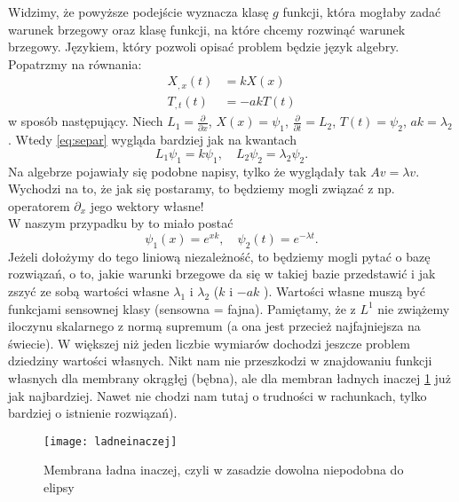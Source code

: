 \documentclass[../main.tex]{subfiles}
\begin{document}
				 Widzimy, że powyższe podejście wyznacza klasę $g$ funkcji, która mogłaby zadać warunek brzegowy oraz klasę funkcji, na które chcemy rozwinąć warunek brzegowy. Językiem, który pozwoli opisać problem będzie język algebry. Popatrzmy na równania:
				 \begin{align}
						 \label{eq:separ}
						 X_{,x}(t) &= k X(x)\\
						 T_{,t}(t) &= -ak T(t)
				 \end{align}
				 w sposób następujący. Niech $L_1 = \frac{\partial }{\partial x}$, $X(x) = \psi_1$, $\frac{\partial }{\partial t} = L_2$, $T(t) = \psi_2$, $ak = \lambda_2$. Wtedy \ref{eq:separ} wygląda bardziej jak na kwantach
				 \[
				 L_1\psi_1 = k\psi_1,\quad L_2\psi_2 = \lambda_2\psi_2
				 .\]
				 Na algebrze pojawiały się podobne napisy, tylko że wyglądały tak $A v = \lambda v$.
				 Wychodzi na to, że jak się postaramy, to będziemy mogli związać z np. operatorem $\partial_x$ jego wektory własne!\\
				 W naszym przypadku by to miało postać
				 \[
						 \psi_1(x) = e^{xk},\quad \psi_2(t) = e^{-\lambda t}
				 .\]
				 Jeżeli dołożymy do tego liniową niezależność, to będziemy mogli pytać o bazę rozwiązań, o to, jakie warunki brzegowe da się w takiej bazie przedstawić i jak zszyć ze sobą wartości własne $\lambda_1$ i $\lambda_2$ ($k$ i $-ak$ ). Wartości własne muszą być funkcjami sensownej klasy (sensowna = fajna).
				 Pamiętamy, że z $L^1$ nie zwiążemy iloczynu skalarnego z normą supremum (a ona jest przecież najfajniejsza na świecie).
				 W większej niż jeden liczbie wymiarów dochodzi jeszcze problem dziedziny wartości własnych.
				 Nikt nam nie przeszkodzi w znajdowaniu funkcji własnych dla membrany okrągłęj (bębna), ale dla membran ładnych inaczej \ref{fig:ladneinaczej} już jak najbardziej. Nawet nie chodzi nam tutaj o trudności w rachunkach, tylko bardziej o istnienie rozwiązań).
				 \begin{figure}[h]
				 		\centering
				 		\texttt{[image: ladneinaczej]}
				 		\caption{Membrana ładna inaczej, czyli w zasadzie dowolna niepodobna do elipsy}
				 		\label{fig:ladneinaczej}
				 \end{figure}
\end{document}
